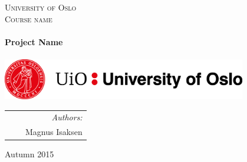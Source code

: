 \thispagestyle{empty}

\begin{center}



\textsc{\LARGE University of Oslo}\\[0.5cm]

\textsc{\Large Course name}\\[2cm]
 

\HRule \\[0.4cm]
 \LARGE \textbf{Project Name}  \\[0.2cm]
\HRule \\[2.5cm]

\vspace{2cm}
\includegraphics[width=0.8\textwidth]{Figures/UiO_Seal_A_ENG.png}\\  %

\vfill 
 
\begin{tabularx}{\textwidth}{l X r}
\hline
& & \large \emph{Authors:}\\
& & \large Magnus Isaksen \\
\hline

\end{tabularx}




\vfill

{\large Autumn 2015}

\end{center}
\cleardoublepage

